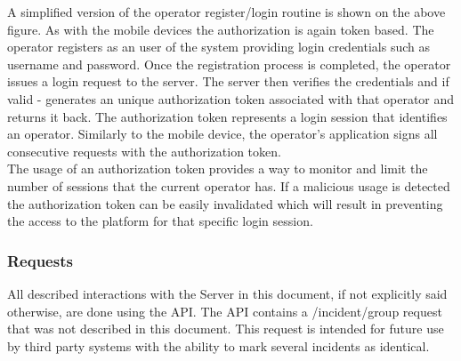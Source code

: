 \documentclass{article}
\begin{document}
A simplified version of the operator register/login routine is shown on the above figure. As with the mobile devices the authorization is again token based. The operator registers as an user of the system providing login credentials such as username and password. Once the registration process is completed, the operator issues a login request to the server. The server then verifies the credentials and if valid - generates an unique authorization token associated with that operator and returns it back. The authorization token represents a login session that identifies an operator. Similarly to the mobile device, the operator’s application signs all consecutive requests with the authorization token. \\

The usage of an authorization token provides a way to monitor and limit the number of sessions that the current operator has. If a malicious usage is detected the authorization token can be easily invalidated which will result in preventing the access to the platform for that specific login session.

\subsubsection{Requests}
All described interactions with the Server in this document, if not explicitly said otherwise, are done using the API. The API contains a /incident/group request that was not described in this document. This request is intended for future use by third party systems with the ability to mark several incidents as identical.
\end{document}
